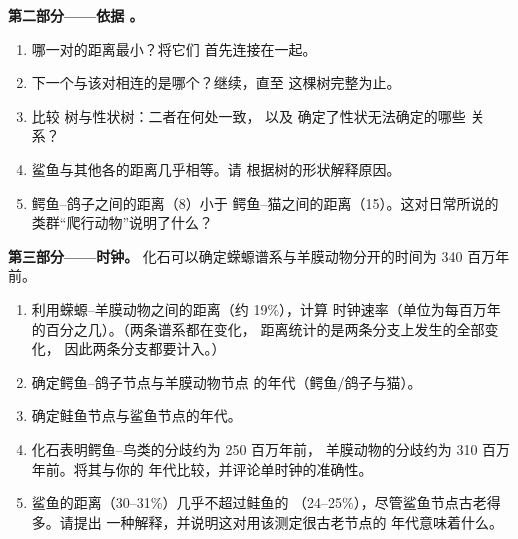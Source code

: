 \begin{problem}
\medskip
\noindent\textbf{第二部分——依据 。}
\begin{enumerate}[resume]
  \item 哪一对的距离最小？将它们
        首先连接在一起。
  \item 下一个与该对相连的是哪个？继续，直至
        这棵树完整为止。
  \item 比较  树与性状树：二者在何处一致，
        以及  确定了性状无法确定的哪些
        关系？
  \item 鲨鱼与其他各的距离几乎相等。请
        根据树的形状解释原因。
  \item 鳄鱼–鸽子之间的距离（8）小于
        鳄鱼–猫之间的距离（15）。这对日常所说的
        类群“爬行动物”说明了什么？
\end{enumerate}

\medskip
\noindent\textbf{第三部分——时钟。}
化石可以确定蝾螈谱系与羊膜动物分开的时间为
340 百万年前。
\begin{enumerate}[resume]
  \item 利用蝾螈–羊膜动物之间的距离（约 19\%），计算
        时钟速率（单位为每百万年的百分之几）。（两条谱系都在变化，
        距离统计的是两条分支上发生的全部变化，
        因此两条分支都要计入。）
  \item 确定鳄鱼–鸽子节点与羊膜动物节点
        的年代（鳄鱼/鸽子与猫）。
  \item 确定鲑鱼节点与鲨鱼节点的年代。
  \item 化石表明鳄鱼–鸟类的分歧约为 250 百万年前，
        羊膜动物的分歧约为 310 百万年前。将其与你的
        年代比较，并评论单时钟的准确性。
  \item 鲨鱼的距离（30--31\%）几乎不超过鲑鱼的
        （24--25\%），尽管鲨鱼节点古老得多。请提出
        一种解释，并说明这对用该测定很古老节点的
        年代意味着什么。
\end{enumerate}


\end{problem}
